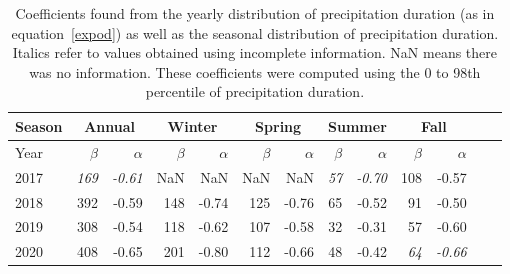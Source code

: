 \begin{table}[htb]
  \begin{center}
    \begin{tabular}{|l|*{11}{r|}r|}
      \hline
      Season    &       \multicolumn{2}{|c|}{Annual}          & \multicolumn{2}{|c|}{Winter}& \multicolumn{2}{|c|}{Spring}  & \multicolumn{2}{|c|}{Summer} &\multicolumn{2}{|c|}{Fall}  \\
      \hline
      Year      & $\beta $ & $\alpha$  & $\beta $ & $\alpha$ & $\beta $ & $\alpha$ & $\beta $ & $\alpha$ & $\beta $ & $\alpha$\\
      \hline
      2017      & \textit{169}  & \textit{-0.61}  & NaN & NaN & NaN & NaN & \textit{57}  & \textit{-0.70}  & 108  & -0.57  \\
      2018      & 392           & -0.59  & 148 & -0.74 & 125 & -0.76 & 65  & -0.52  & 91 & -0.50  \\
      2019      & 308           & -0.54  & 118  & -0.62 & 107 & -0.58 & 32 & -0.31  & 57 &  -0.60 \\
      2020      & 408           & -0.65   & 201  & -0.80 & 112  & -0.66 & 48  & -0.42 & \textit{64} & \textit{-0.66}\\
      \hline
    \end{tabular}
  \end{center}
\caption[Year comparison of
  coefficients of precipitation duration using 0 to 98th percentile]{\label{firsttable}Coefficients found from the yearly
  distribution of precipitation duration (as in equation~\ref{expod})
  as well as the seasonal distribution of precipitation
  duration. Italics refer to values obtained using incomplete
  information. NaN means there was no information. These coefficients were computed using the 0 to 98th percentile of precipitation duration.}
\end{table}

